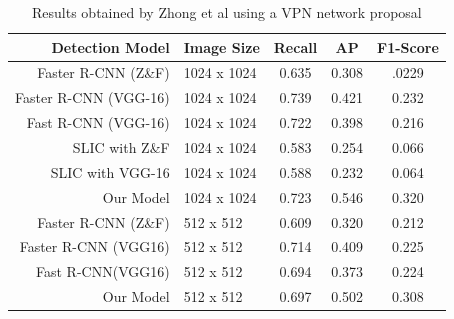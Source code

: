 \documentclass{IEEEtran}
\begin{document}
\begin{table}[ht]
\centering
\caption{Results obtained by Zhong et al \cite{Zhong2017} using a VPN network proposal}
\label{zhongtable}
\begin{tabular}{rlccc}
\hline
\multicolumn{1}{|r|}{\textbf{Detection Model}} & \multicolumn{1}{l|}{\textbf{Image Size}} & \multicolumn{1}{c|}{\textbf{Recall}} & \multicolumn{1}{c|}{\textbf{AP}} & \multicolumn{1}{c|}{\textbf{F1-Score}} \\ \hline
Faster R-CNN (Z\&F)                            & 1024 x 1024                              & 0.635                                & 0.308                            & .0229                                  \\
Faster R-CNN (VGG-16)                          & 1024 x 1024                              & 0.739                                & 0.421                            & 0.232                                  \\
Fast R-CNN (VGG-16)                            & 1024 x 1024                              & 0.722                                & 0.398                            & 0.216                                  \\
SLIC with Z\&F                                 & 1024 x 1024                              & 0.583                                & 0.254                            & 0.066                                  \\
SLIC with VGG-16                               & 1024 x 1024                              & 0.588                                & 0.232                            & 0.064                                  \\
Our Model                                      & 1024 x 1024                              & 0.723                                & 0.546                            & 0.320                                  \\
Faster R-CNN (Z\&F)                            & 512 x 512                                & 0.609                                & 0.320                            & 0.212                                  \\
Faster R-CNN (VGG16)                           & 512 x 512                                & 0.714                                & 0.409                            & 0.225                                  \\
Fast R-CNN(VGG16)                              & 512 x 512                                & 0.694                                & 0.373                            & 0.224                                  \\
Our Model                                      & 512 x 512                                & 0.697                                & 0.502                            & 0.308                                 
\end{tabular}
\end{table}
\end{document}
